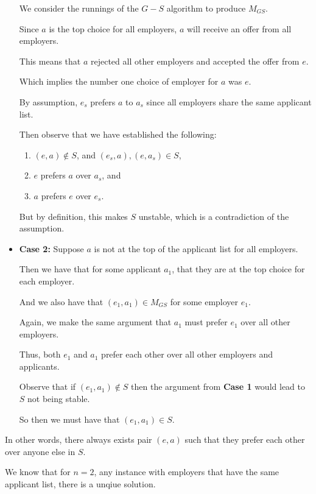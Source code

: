 \begin{questions}
\begin{soln}
\begin{itemize}
			      We consider the runnings of the \(G-S\) algorithm to produce \(M_{GS}\).

			      Since \(a\) is the top choice for all employers, \(a\) will receive an offer from all employers.

			      This means that \(a\) rejected all other employers and accepted the offer from \(e\).

			      Which implies the number one choice of employer for \(a\) was \(e\).

			      By assumption, \(e_s\) prefers \(a\) to \(a_s\) since all employers share the same applicant list.

			      Then observe that we have established the following:

			      \begin{enumerate}
				      \item \((e, a) \notin S\), and \((e_s, a), (e, a_s) \in S\),
				      \item \(e\) prefers \(a\) over \(a_s\), and
				      \item \(a\) prefers \(e\) over \(e_s\).
			      \end{enumerate}

			      But by definition, this makes \(S\) unstable, which is a contradiction of the assumption.

			\item \textbf{Case 2:} Suppose \(a\) is not at the top of the applicant list for all employers.

			      Then we have that for some applicant \(a_1\), that they are at the top choice for each employer.

			      And we also have that \((e_1, a_1) \in M_{GS}\) for some employer \(e_1\).

			      Again, we make the same argument that \(a_1\) must prefer \(e_1\) over all other employers.

			      Thus, both \(e_1\) and \(a_1\) prefer each other over all other employers and applicants.

			      Observe that if \((e_1, a_1) \notin S\) then the argument from \textbf{Case 1} would lead to \(S\) not being stable.

			      So then we must have that \((e_1, a_1) \in S\).
		\end{itemize}
		In other words, there always exists pair \((e, a)\) such that they prefer each other over anyone else in \(S\).

		We know that for \(n = 2\), any instance with employers that have the same applicant list, there is a unqiue solution.


\end{soln}
\end{questions}
